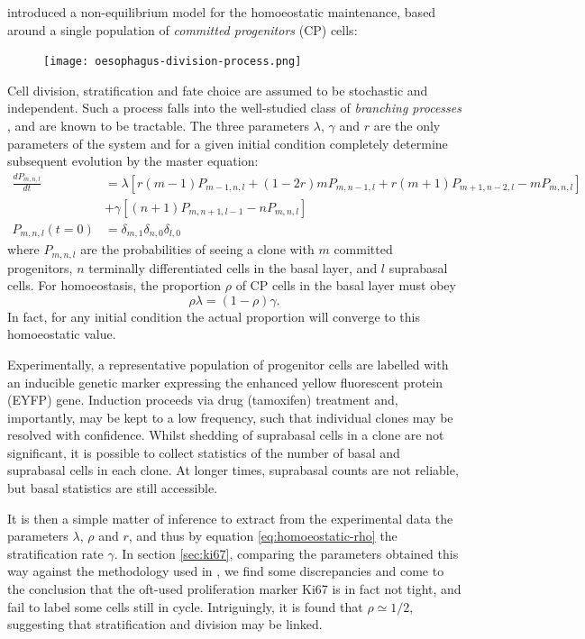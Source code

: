 \documentclass[10pt,english]{report}
\begin{document}
\citet{klein07} introduced a non-equilibrium model for the homoeostatic maintenance, based around a single population of \emph{committed progenitors} (CP) cells:

\begin{figure}[h]
	\centering
	\texttt{[image: oesophagus-division-process.png]}
\end{figure}

Cell division, stratification and fate choice are assumed to be stochastic and independent. Such a process falls into the well-studied class of \emph{branching processes} \citep{athreya&ney}, and are known to be tractable. The three parameters $\lambda$, $\gamma$ and $r$ are the only parameters of the system and for a given initial condition completely determine subsequent evolution by the master equation:
\begin{align}
\nonumber
\frac{dP_{m,n,l}}{dt} &= \lambda\left[r (m-1)P_{m-1,n,l} + (1-2r)mP_{m,n-1,l} + r(m+1)P_{m+1,n-2,l} - mP_{m,n,l}\right] \\
                    &+ \gamma\left[(n+1)P_{m,n+1,l-1} - nP_{m,n,l}\right] \label{eq:ABC-master} \\
\nonumber
P_{m,n,l}(t = 0) &= \delta_{m,1} \delta_{n,0} \delta_{l,0}
\end{align}
where $P_{m,n,l}$ are the probabilities of seeing a clone with $m$ committed progenitors, $n$ terminally differentiated cells in the basal layer, and $l$ suprabasal cells. For homoeostasis, the proportion $\rho$ of CP cells in the basal layer must obey
\begin{equation}
\rho \lambda = (1-\rho) \gamma.\label{eq:homoeostatic-rho}
\end{equation}
In fact, for any initial condition the actual proportion will converge to this homoeostatic value.

Experimentally, a representative population of progenitor cells are labelled with an inducible genetic marker expressing the enhanced yellow fluorescent protein (EYFP) gene. Induction proceeds via drug (tamoxifen) treatment and, importantly, may be kept to a low frequency, such that individual clones may be resolved with confidence. Whilst shedding of suprabasal cells in a clone are not significant, it is possible to collect statistics of the number of basal and suprabasal cells in each clone. At longer times, suprabasal counts are not reliable, but basal statistics are still accessible.

It is then a simple matter of inference to extract from the experimental data the parameters $\lambda$, $\rho$ and $r$, and thus by equation \eqref{eq:homoeostatic-rho} the stratification rate $\gamma$. In section \ref{sec:ki67}, comparing the parameters obtained this way against the methodology used in \citet{clayton}, we find some discrepancies and come to the conclusion that the oft-used proliferation marker Ki67 is in fact not tight, and fail to label some cells still in cycle. Intriguingly, it is found that $\rho \simeq 1/2$, suggesting that stratification and division may be linked.
\end{document}
